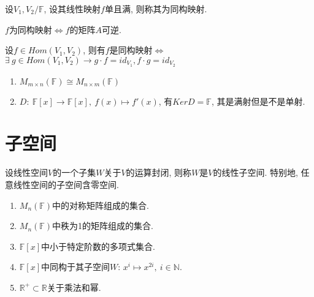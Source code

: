 \begin{definition}[同构映射]
    设$V_1, V_2 / \mathbb{F}$, 设其线性映射$f$单且满, 则称其为同构映射.
\end{definition}

\begin{inference}
    $f$为同构映射$\Longleftrightarrow$$f$的矩阵$A$可逆.
\end{inference}

\begin{lemma}
    设$f \in Hom(V_1, V_2)$, 则有$f$是同构映射$\Longleftrightarrow$$\exists \ g \in Hom(V_1, V_2) \rightarrow g \cdot f = id_{V_1}, f \cdot g = id_{V_2}$    
\end{lemma}

\begin{example}
    \begin{enumerate}[itemindent=1em]
        \item $M_{m \times n}(\mathbb{F}) \cong M_{n \times m}(\mathbb{F})$
        \item $D: \ \mathbb{F}[x] \to \mathbb{F}[x], \ f(x) \mapsto f'(x)$, 有$KerD = \mathbb{F}$, 其是满射但是不是单射.
    \end{enumerate}
\end{example}

\section{ 子空间 }

\begin{definition}[子空间]
    设线性空间$V$的一个子集$W$关于$V$的运算封闭, 则称$W$是$V$的线性子空间. 特别地, 任意线性空间的子空间含零空间.
\end{definition}

\begin{example}
    \begin{enumerate}[itemindent=1em]
        \item $M_{n}(\mathbb{F})$中的对称矩阵组成的集合.
        \item $M_n(\mathbb{F})$中秩为1的矩阵组成的集合.
        \item $\mathbb{F}[x]$中小于特定阶数的多项式集合.
        \item $\mathbb{F}[x]$中同构于其子空间$W$: $x^i \mapsto x^{2i},\ i \in \mathbb{N}$.
        \item $\mathbb{R^+} \subset \mathbb{R}$关于乘法和幂.
    \end{enumerate}
\end{example}

